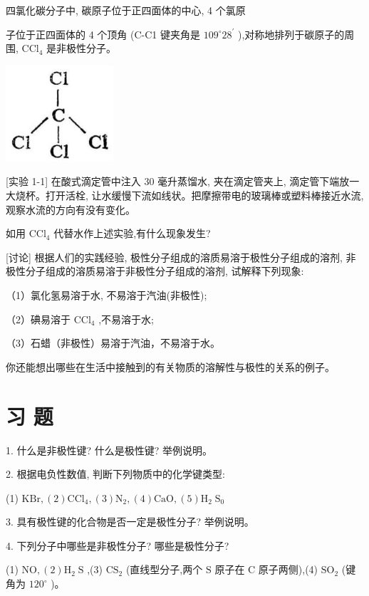 \documentclass[10pt]{article}
\begin{document}
四氯化碳分子中, 碳原子位于正四面体的中心, 4 个氯原

子位于正四面体的 4 个顶角 (C-C1 键夹角是 \({109}^{ \circ }{28}^{\prime }\) ),对称地排列于碳原子的周围, \({\mathrm{{CCl}}}_{4}\) 是非极性分子。

\begin{center}
\includegraphics[max width=0.3\textwidth]{images/01912d13-9986-7822-a012-3f3f7be99dcb_24_696485.jpg}
\end{center}

[实验 1-1] 在酸式滴定管中注入 30 毫升蒸馏水, 夹在滴定管夹上, 滴定管下端放一大烧杯。打开活栓, 让水缓慢下流如线状。把摩擦带电的玻璃棒或塑料棒接近水流, 观察水流的方向有没有变化。

如用 \({\mathrm{{CCl}}}_{4}\) 代替水作上述实验,有什么现象发生?

[讨论] 根据人们的实践经验, 极性分子组成的溶质易溶于极性分子组成的溶剂, 非极性分子组成的溶质易溶于非极性分子组成的溶剂, 试解释下列现象:

（1）氯化氢易溶于水, 不易溶于汽油(非极性);

（2）碘易溶于 \({\mathrm{{CCl}}}_{4}\) ,不易溶于水;

（3）石蜡（非极性）易溶于汽油，不易溶于水。

你还能想出哪些在生活中接触到的有关物质的溶解性与极性的关系的例子。

\section*{习 题}

1. 什么是非极性键? 什么是极性键? 举例说明。

2. 根据电负性数值, 判断下列物质中的化学键类型:

(1) \(\mathrm{{KBr}},\left( 2\right) {\mathrm{{CCl}}}_{4},\left( 3\right) {\mathrm{N}}_{2},\left( 4\right) \mathrm{{CaO}},\left( 5\right) {\mathrm{H}}_{2}{\mathrm{\;S}}_{0}\)

3. 具有极性键的化合物是否一定是极性分子? 举例说明。

4. 下列分子中哪些是非极性分子? 哪些是极性分子?

(1) \(\mathrm{{NO}},\left( 2\right) {\mathrm{H}}_{2}\mathrm{\;S}\) ,(3) \({\mathrm{{CS}}}_{2}\) (直线型分子,两个 \(\mathrm{S}\) 原子在 C 原子两侧),(4) \({\mathrm{{SO}}}_{2}\) (键角为 \({120}^{ \circ }\) )。
\end{document}
